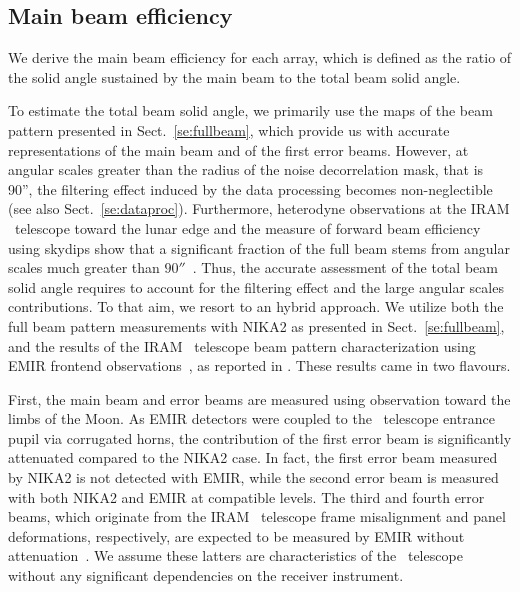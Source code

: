 
\subsection{Main beam efficiency}
\label{se:beam_efficiency}

We derive the main beam efficiency for each array, which is defined as the
ratio of the solid angle sustained by the main beam to the total beam
solid angle.

{\rev To estimate the total beam solid angle, we primarily use the maps
of the beam pattern presented in Sect.~\ref{se:fullbeam}, which
provide us with accurate representations of the main beam and of the
first error beams. However, at angular scales greater than the radius
of the noise decorrelation mask, that is 90'', the
filtering effect induced by the data processing becomes
non-neglectible (see also Sect.~\ref{se:dataproc}). Furthermore,
heterodyne observations at the IRAM \trentemetre\ telescope
toward the lunar edge and the measure of forward beam efficiency using
skydips show that a significant fraction of the full beam stems
from angular scales much greater than $90''$~\citep{Greve1998,
Kramer2013}. Thus, the accurate assessment of the total beam solid
angle requires to account for the filtering effect and the large
angular scales contributions. To that aim, we resort to an hybrid
approach. We utilize both the full beam pattern measurements with
NIKA2 as presented in Sect.~\ref{se:fullbeam}, and the results of the
IRAM \trentemetre\ telescope beam pattern characterization using EMIR
frontend observations~\citep{Carter2012}, as reported
in \citet{Kramer2013}. These results came in two flavours.}

{\rev First, the main beam and error beams are measured using observation toward
the limbs of the Moon. As EMIR detectors were coupled to
the \trentemetre\ telescope entrance pupil via corrugated horns, the
contribution of the first error beam is significantly attenuated
compared to the NIKA2 case. In fact, the first error beam measured by
NIKA2 is not detected with EMIR, while the second error beam is
measured with both NIKA2 and EMIR at compatible levels. The third and
fourth error beams, which originate from the IRAM \trentemetre\
telescope frame misalignment and panel deformations, respectively, are
expected to be measured by EMIR without
attenuation~\citep{Kramer2013}. We assume these latters are
characteristics of the \trentemetre\ telescope without any significant
dependencies on the receiver instrument.}

